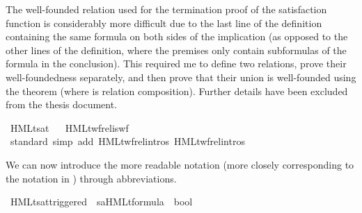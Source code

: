 \begin{isabellebody}
\endisatagproof
{\isafoldproof}%
%
\isadelimproof
%
\endisadelimproof
%
\begin{isamarkuptext}%
The well-founded relation used for the termination proof of the satisfaction function is considerably more difficult due to the last line of the definition containing the same formula on both sides of the implication (as opposed to the other lines of the definition, where the premises only contain subformulas of the formula in the conclusion). This required me to define two relations, prove their well-foundedness separately, and then prove that their union is well-founded using the theorem  (where  is relation composition). Further details have been excluded from the thesis document.%
\end{isamarkuptext}\isamarkuptrue%
%
\isadelimunimportant
%
\endisadelimunimportant
%
\isatagunimportant
%
\endisatagunimportant
{\isafoldunimportant}%
%
\isadelimunimportant
\isanewline
%
\endisadelimunimportant
{}\isamarkupfalse%
\ HMLt{\isacharunderscore}{\kern0pt}sat%
\isadelimproof
\ %
\endisadelimproof
%
\isatagproof
{}\isamarkupfalse%
\ HMLt{\isacharunderscore}{\kern0pt}wf{\isacharunderscore}{\kern0pt}rel{\isacharunderscore}{\kern0pt}is{\isacharunderscore}{\kern0pt}wf\ \isamarkupfalse%
\ {\isacharparenleft}{\kern0pt}standard{\isacharcomma}{\kern0pt}\ {\isacharparenleft}{\kern0pt}simp\ add{\isacharcolon}{\kern0pt}\ HMLt{\isacharunderscore}{\kern0pt}wf{\isacharunderscore}{\kern0pt}rel{\isacharunderscore}{\kern0pt}{}{\isachardot}{\kern0pt}intros\ HMLt{\isacharunderscore}{\kern0pt}wf{\isacharunderscore}{\kern0pt}rel{\isacharunderscore}{\kern0pt}{}{\isachardot}{\kern0pt}intros{\isacharparenright}{\kern0pt}{\isacharplus}{\kern0pt}{\isacharparenright}{\kern0pt}%
\endisatagproof
{\isafoldproof}%
%
\isadelimproof
%
\endisadelimproof
%
\begin{isamarkuptext}%
We can now introduce the more readable notation (more closely corresponding to the notation in \cite{rbs}) through abbreviations.%
\end{isamarkuptext}\isamarkuptrue%
\isamarkupfalse%
\ HMLt{\isacharunderscore}{\kern0pt}sat{\isacharunderscore}{\kern0pt}triggered\ {\isacharcolon}{\kern0pt}{\isacharcolon}{\kern0pt}\ {\isacartoucheopen}{\isacharprime}{\kern0pt}s{\isasymRightarrow}{\isacharparenleft}{\kern0pt}{\isacharprime}{\kern0pt}a{\isacharparenright}{\kern0pt}HMLt{\isacharunderscore}{\kern0pt}formula\ {\isasymRightarrow}\ bool{\isacartoucheclose}\ \isanewline

\end{isabellebody}
